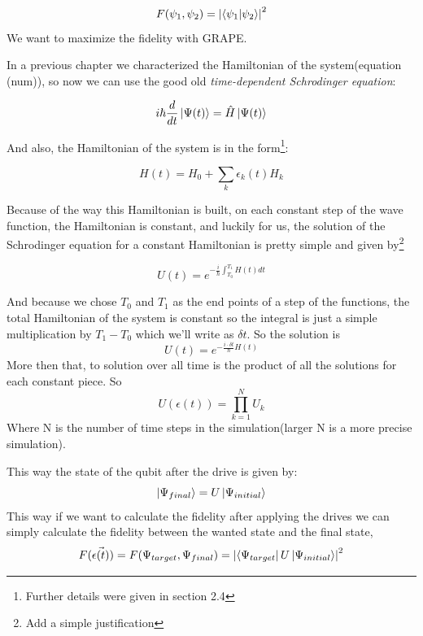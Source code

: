 \documentclass[english, a4paper, 12pt, twoside]{article}
\numberwithin{equation}{section} %
\begin{document}
\begin{equation} \label{def:fid}
F(\psi_1, \psi_2) = \abs{\braket{\psi_1}{\psi_2}}^2
\end{equation}
We want to maximize the fidelity with GRAPE.\par
In a previous chapter we characterized the Hamiltonian of the system(equation (num)), so now we can use the good old \textit{time-dependent Schrodinger equation}:

\begin{equation}
i\hbar\frac{d}{dt}\ket{\Psi(t)} = \hat{H}\ket{\Psi(t)}
\end{equation}

And also, the Hamiltonian of the system is in the form\footnote{Further details were given in section 2.4}:

\begin{equation}
H(t) = H_0 + \sum_k{\epsilon_k(t) H_k} %
\end{equation}

Because of the way this Hamiltonian is built, on each constant step of the wave function, the Hamiltonian is constant, and luckily for us, the solution of the Schrodinger equation for a constant Hamiltonian is pretty simple and given by\footnote{Add a simple justification} %

\begin{equation}
U(t) = e^{-\frac{i}{\hbar}\int_{T_0}^{T_1}H(t)dt}
\end{equation}

And because we chose $T_0$ and $T_1$ as the end points of a step of the functions, the total Hamiltonian of the system is constant so the integral is just a simple multiplication by $T_1-T_0$ which we'll write as $\delta t$. So the solution is
\begin{equation}
U(t) = e^{-\frac{i\cdot \delta t}{\hbar}H(t)}
\end{equation}
More then that, to solution over all time is the product of all the solutions for each constant piece. So 
\begin{equation}
U(\epsilon(t)) = \prod_{k = 1}^NU_k
\end{equation}
Where N is the number of time steps in the simulation(larger N is a more precise simulation). \par
This way the state of the qubit after the drive is given by:
\begin{equation}
\ket{\Psi_{final}} = U\ket{\Psi_{initial}}
\end{equation}
This way if we want to calculate the fidelity after applying the drives we can simply calculate the fidelity between the wanted state and the final state,
\begin{equation}
F(\Vec{\epsilon(t)}) = F(\Psi_{target}, \Psi_{final}) = \abs{\bra{\Psi_{target}}U\ket{\Psi_{initial}}}^2
\end{equation}
\end{document}
